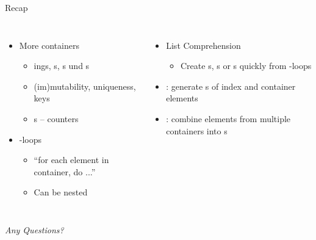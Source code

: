 
\begin{frame}[t,plain]
\titlepage
\end{frame}


\begin{frame}{Recap}
%
\begin{columns}[T]
\begin{itemize}
\item More containers
	\begin{itemize}
	\item {}ings, s, s und s
	\item (im)mutability, uniqueness, keys
	\item {}s -- counters
	\end{itemize}
\item {}-loops
	\begin{itemize}
	\item \enquote{for each element in container, do ...}
	\item Can be nested
	\end{itemize}
\end{itemize}
%
\begin{itemize}
\item List Comprehension
	\begin{itemize}
	\item Create s, s or s quickly from -loops
	\end{itemize}
\item {}: generate s of index and container elements
\item {}: combine elements from multiple containers into s
\end{itemize}

\end{columns}
%
\begin{center}
	\emph{Any Questions?}
\end{center}
%
\end{frame}


